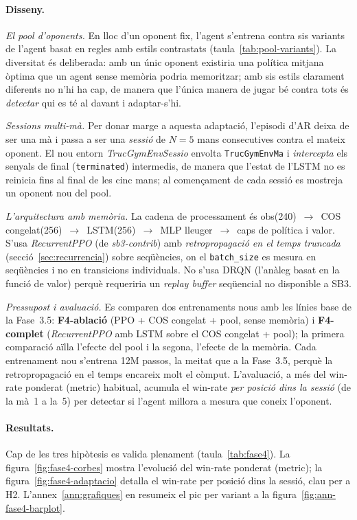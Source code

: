 \paragraph{Disseny.}

\emph{El pool d'oponents.} En lloc d'un oponent fix, l'agent s'entrena contra sis variants
de l'agent basat en regles amb estils contrastats (taula~\ref{tab:pool-variants}). La diversitat
és deliberada: amb un únic oponent existiria una política mitjana òptima que un agent sense
memòria podria memoritzar; amb sis estils clarament diferents no n'hi ha cap, de manera que
l'única manera de jugar bé contra tots és \emph{detectar} qui es té al davant i adaptar-s'hi.

\emph{Sessions multi-mà.} Per donar marge a aquesta adaptació, l'episodi d'\ac{AR} deixa de
ser una mà i passa a ser una \emph{sessió} de \(N=5\) mans consecutives contra el mateix
oponent. El nou entorn \emph{TrucGymEnvSessio} envolta \texttt{TrucGymEnvMa} i
\emph{intercepta} els senyals de final (\texttt{terminated}) intermedis, de manera que
l'estat de l'\ac{LSTM} no es reinicia fins al final de les cinc mans; al començament de cada
sessió es mostreja un oponent nou del pool.

\emph{L'arquitectura amb memòria.} La cadena de processament és
obs(240)~$\rightarrow$~COS congelat(256)~$\rightarrow$~\ac{LSTM}(256)~$\rightarrow$~\ac{MLP}
lleuger~$\rightarrow$~caps de política i valor. S'usa \emph{RecurrentPPO} (de
\emph{sb3-contrib}) amb \emph{retropropagació en el temps truncada}
(secció~\ref{sec:recurrencia}) sobre seqüències, on el \texttt{batch\_size} es mesura en seqüències
i no en transicions individuals. No s'usa \acs{DRQN} (l'anàleg basat en la funció de valor)
perquè requeriria un \emph{replay buffer} seqüencial no disponible a \ac{SB3}.

\emph{Pressupost i avaluació.} Es comparen dos entrenaments nous amb les línies base de la Fase~3.5:
\textbf{F4-ablació} (PPO + COS congelat + pool, sense memòria) i \textbf{F4-complet}
(\emph{RecurrentPPO} amb \ac{LSTM} sobre el COS congelat + pool); la primera comparació
aïlla l'efecte del pool i la segona, l'efecte de la memòria. Cada entrenament nou s'entrena 12M
passos, la meitat que a la Fase~3.5, perquè la retropropagació en el temps encareix molt el
còmput. L'avaluació, a més del win-rate ponderat (\(\text{metric}\)) habitual, acumula el
win-rate \emph{per
posició dins la sessió} (de la mà~1 a la~5) per detectar si l'agent millora a mesura que
coneix l'oponent.

\paragraph{Resultats.} Cap de les tres hipòtesis es valida plenament
(taula~\ref{tab:fase4}). La figura~\ref{fig:fase4-corbes} mostra l'evolució del win-rate
ponderat (\(\text{metric}\)); la figura~\ref{fig:fase4-adaptacio} detalla el win-rate per
posició dins la sessió, clau per a H2. L'annex~\ref{ann:grafiques} en resumeix el pic per
variant a la figura~\ref{fig:ann-fase4-barplot}.


